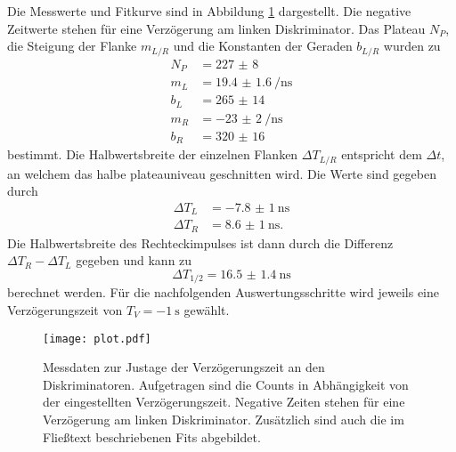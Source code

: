 Die Messwerte und Fitkurve sind in Abbildung \ref{fig:Verzögerung} dargestellt. Die negative Zeitwerte stehen für eine Verzögerung am linken Diskriminator. 
Das Plateau $ N_P$, die Steigung der Flanke $m_{L/R}$ und die Konstanten der Geraden $b_{L/R}$ wurden zu 
\begin{align}
    N_P &=  \num{227(8)} \\
    m_L &=  \SI{19.4(16)}{\per \nano \second}  \\
    b_L &=  \num{265(14)} \\
    m_R &=  \SI{-23(2)}{\per \nano \second} \\
    b_R &=  \num{320(16)}
\end{align}
bestimmt. Die Halbwertsbreite der einzelnen Flanken $\Delta T_{L/R}$ entspricht dem $\Delta t $, an welchem das halbe plateauniveau geschnitten wird. Die Werte sind gegeben durch 
\begin{align*}
    \Delta T_{L} &= -\SI{7.8(10)}{\nano \second} \\
    \Delta T_{R} &= \SI{8.6(10)}{\nano \second} .
\end{align*}
Die Halbwertsbreite des Rechteckimpulses ist dann durch die Differenz $\Delta T_{R} - \Delta T_{L}$ gegeben und kann zu 
\begin{equation*}
    \Delta T_{1/2} = \SI{16.5(14)}{\nano \second}
\end{equation*}
berechnet werden.
Für die nachfolgenden Auswertungsschritte wird jeweils eine Verzögerungszeit von $T_V = \SI{-1}{\second}$ gewählt.
\begin{figure}
    \centering
    \texttt{[image: plot.pdf]}
    \caption{Messdaten zur Justage der Verzögerungszeit an den Diskriminatoren. Aufgetragen sind die Counts in Abhängigkeit von der eingestellten Verzögerungszeit. Negative Zeiten stehen für eine Verzögerung am linken Diskriminator. Zusätzlich sind auch die im Fließtext beschriebenen Fits abgebildet.}
    \label{fig:Verzögerung}
\end{figure} 

